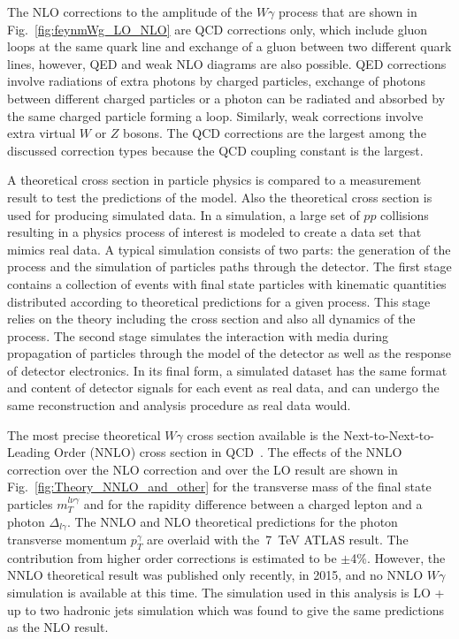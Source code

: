 The NLO corrections to the amplitude of the $W\gamma$ process that are shown in Fig.~\ref{fig:feynmWg_LO_NLO} are QCD corrections only, which include gluon loops at the same quark line and exchange of a gluon between two different quark lines, however, QED and weak NLO diagrams are also possible. QED corrections involve radiations of extra photons by charged particles, exchange of photons between different charged particles or a photon can be radiated and absorbed by the same charged particle forming a loop. Similarly, weak corrections involve extra virtual $W$ or $Z$ bosons. The QCD corrections are the largest among the discussed correction types because the QCD coupling constant is the largest.

A theoretical cross section in particle physics is compared to a measurement result to test the predictions of the model. Also the theoretical cross section is used for producing simulated data. In a simulation, a large set of $pp$ collisions resulting in a physics process of interest is modeled to create a data set that mimics real data. A typical simulation consists of two parts: the generation of the process and the simulation of particles paths through the detector. The first stage contains a collection of events with final state particles with kinematic quantities distributed according to theoretical predictions for a given process. This stage relies on the theory including the cross section and also all dynamics of the process. The second stage simulates the interaction with media during propagation of particles through the model of the detector as well as the response of detector electronics. In its final form, a simulated dataset has the same format and content of detector signals for each event as real data, and can undergo the same reconstruction and analysis procedure as real data would.

The most precise theoretical $W\gamma$ cross section available is the Next-to-Next-to-Leading Order (NNLO) cross section in QCD~\cite{ref_theory_NNLO}. The effects of the NNLO correction over the NLO correction and over the LO result are shown in Fig.~\ref{fig:Theory_NNLO_and_other} for the transverse mass of the final state particles $m_T^{l \nu \gamma}$ and for the rapidity difference between a charged lepton and a photon $\Delta_{l\gamma}$. The NNLO and NLO theoretical predictions for the photon transverse momentum $p_T^\gamma$ are overlaid with the~7~TeV ATLAS result. The contribution from higher order corrections is estimated to be $\pm$4\%. However, the NNLO theoretical result was published only recently, in 2015, and no NNLO $W\gamma$ simulation is available at this time. The simulation used in this analysis is LO + up to two hadronic jets simulation which was found to give the same predictions as the NLO result.

